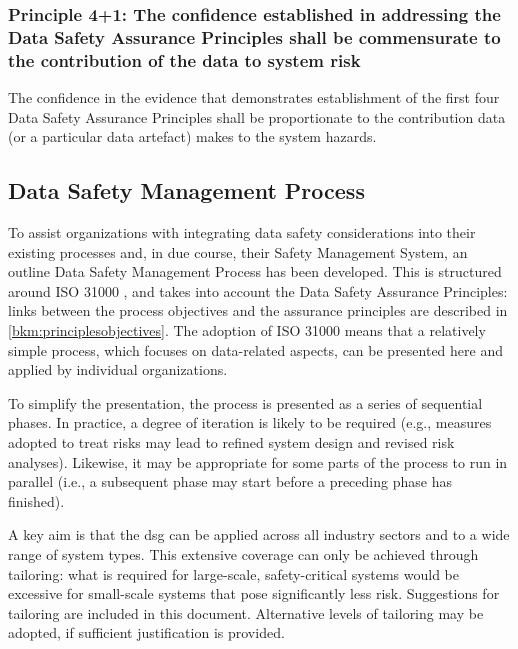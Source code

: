 \subsubsection{Principle 4+1: The confidence established in addressing the Data Safety Assurance Principles shall be commensurate to the contribution of the data to system risk}
The confidence in the evidence that demonstrates establishment of the first four Data Safety Assurance Principles shall be proportionate to the contribution data (or a particular data artefact) makes to the system hazards.

\subsection{Data Safety Management Process}
To assist organizations with integrating data safety considerations into their existing processes and, in due course, their Safety Management System, an outline Data Safety Management Process has been developed.
This is structured around
ISO 31000 \cite{citation:iso310002018risk},
and takes into account the Data Safety Assurance Principles: links between the process objectives and the assurance principles are described in \autoref{bkm:principlesobjectives}.
The adoption of ISO 31000 means that a relatively simple process, which focuses on data-related aspects, can be presented here and applied by individual organizations. 

To simplify the presentation, the process is presented as a series of sequential phases. In practice, a degree of iteration is likely to be required (e.g., measures adopted to treat risks may lead to refined system design and revised risk analyses). Likewise, it may be appropriate for some parts of the process to run in parallel (i.e., a subsequent phase may start before a preceding phase has finished).

A key aim is that the \gls{dsg} can be applied across all industry sectors and to a wide range of system types. This extensive coverage can only be achieved through tailoring: what is required for large-scale, safety-critical systems would be excessive for small-scale systems that pose significantly less risk. Suggestions for tailoring are included in this document. Alternative levels of tailoring may be adopted, if sufficient justification is provided.

